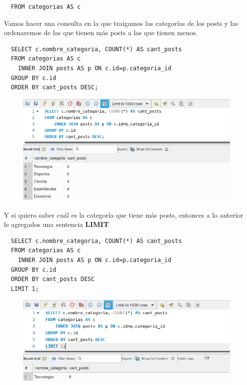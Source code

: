 \documentclass{article}
\begin{document}
\begin{verbatim}
  FROM categorias AS c
\end{verbatim}

Vamos hacer una consulta en la que traigamos las categorías de los posts y las
ordenaremos de las que tienen más posts a las que tienen menos.\\

\begin{verbatim}
  SELECT c.nombre_categoria, COUNT(*) AS cant_posts
  FROM categorias AS c
    INNER JOIN posts AS p ON c.id=p.categoria_id
  GROUP BY c.id
  ORDER BY cant_posts DESC;
\end{verbatim}
\begin{figure}[h!]
  \centering
  \includegraphics[scale=0.75]{./Pictures/138_fourth_question.png}
\end{figure}

Y si quiero saber cuál es la categoría que tiene más posts, entonces a lo
anterior le agregados una sentencia \textbf{LIMIT}\\

\begin{verbatim}
  SELECT c.nombre_categoria, COUNT(*) AS cant_posts
  FROM categorias AS c
    INNER JOIN posts AS p ON c.id=p.categoria_id
  GROUP BY c.id
  ORDER BY cant_posts DESC
  LIMIT 1;
\end{verbatim}

\begin{figure}[h!]
  \centering
  \includegraphics[scale=0.75]{./Pictures/139_fifth_question.png}
\end{figure}
\end{document}
